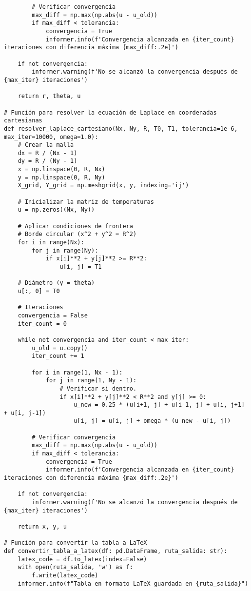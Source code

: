 \begin{verbatim}
        # Verificar convergencia
        max_diff = np.max(np.abs(u - u_old))
        if max_diff < tolerancia:
            convergencia = True
            informer.info(f'Convergencia alcanzada en {iter_count} iteraciones con diferencia máxima {max_diff:.2e}')

    if not convergencia:
        informer.warning(f'No se alcanzó la convergencia después de {max_iter} iteraciones')

    return r, theta, u

# Función para resolver la ecuación de Laplace en coordenadas cartesianas
def resolver_laplace_cartesiano(Nx, Ny, R, T0, T1, tolerancia=1e-6, max_iter=10000, omega=1.0):
    # Crear la malla
    dx = R / (Nx - 1)
    dy = R / (Ny - 1)
    x = np.linspace(0, R, Nx)
    y = np.linspace(0, R, Ny)
    X_grid, Y_grid = np.meshgrid(x, y, indexing='ij')

    # Inicializar la matriz de temperaturas
    u = np.zeros((Nx, Ny))

    # Aplicar condiciones de frontera
    # Borde circular (x^2 + y^2 = R^2)
    for i in range(Nx):
        for j in range(Ny):
            if x[i]**2 + y[j]**2 >= R**2:
                u[i, j] = T1

    # Diámetro (y = theta)
    u[:, 0] = T0

    # Iteraciones
    convergencia = False
    iter_count = 0

    while not convergencia and iter_count < max_iter:
        u_old = u.copy()
        iter_count += 1

        for i in range(1, Nx - 1):
            for j in range(1, Ny - 1):
                # Verificar si dentro.
                if x[i]**2 + y[j]**2 < R**2 and y[j] >= 0:
                    u_new = 0.25 * (u[i+1, j] + u[i-1, j] + u[i, j+1] + u[i, j-1])
                    u[i, j] = u[i, j] + omega * (u_new - u[i, j])

        # Verificar convergencia
        max_diff = np.max(np.abs(u - u_old))
        if max_diff < tolerancia:
            convergencia = True
            informer.info(f'Convergencia alcanzada en {iter_count} iteraciones con diferencia máxima {max_diff:.2e}')

    if not convergencia:
        informer.warning(f'No se alcanzó la convergencia después de {max_iter} iteraciones')

    return x, y, u

# Función para convertir la tabla a LaTeX
def convertir_tabla_a_latex(df: pd.DataFrame, ruta_salida: str):
    latex_code = df.to_latex(index=False)
    with open(ruta_salida, 'w') as f:
        f.write(latex_code)
    informer.info(f"Tabla en formato LaTeX guardada en {ruta_salida}")


\end{verbatim}

